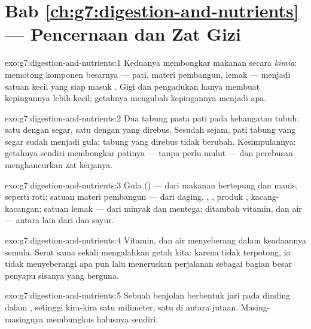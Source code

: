 \section*{Bab \ref{ch:g7:digestion-and-nutrients} --- Pencernaan dan Zat Gizi}

\begin{solution}{exo:g7:digestion-and-nutrients:1}
Keduanya membongkar makanan secara \emph{kimia}: memotong komponen
besarnya --- pati, materi pembangun, lemak --- menjadi satuan kecil
yang siap masuk . Gigi dan pengadukan hanya membuat kepingannya
lebih kecil; getahnya mengubah kepingannya menjadi apa.
\end{solution}

\begin{solution}{exo:g7:digestion-and-nutrients:2}
Dua tabung pasta pati pada kehangatan tubuh: satu dengan 
segar, satu dengan  yang direbus. Sesudah sejam, pati tabung
yang segar sudah menjadi gula; tabung yang direbus tidak berubah.
Kesimpulannya: getahnya sendiri membongkar patinya --- tanpa perlu
mulut --- dan perebusan menghancurkan zat kerjanya.
\end{solution}

\begin{solution}{exo:g7:digestion-and-nutrients:3}
Gula () --- dari makanan bertepung dan manis, seperti roti;
satuan materi pembangun --- dari daging, , , produk ,
kacang-kacangan; satuan lemak --- dari minyak dan mentega; ditambah
vitamin,  dan air --- antara lain dari  dan sayur.
\end{solution}

\begin{solution}{exo:g7:digestion-and-nutrients:4}
Vitamin,  dan air menyeberang dalam keadaannya semula.
Serat sama sekali mengalahkan getah kita: karena tidak terpotong, ia
tidak menyeberangi apa pun lalu meneruskan perjalanan sebagai bagian
besar penyapu sisanya yang berguna.
\end{solution}

\begin{solution}{exo:g7:digestion-and-nutrients:5}
Sebuah benjolan berbentuk jari pada dinding dalam ,
setinggi kira-kira satu milimeter, satu di antara jutaan.
Masing-masingnya membungkus  halusnya sendiri.
\end{solution}

